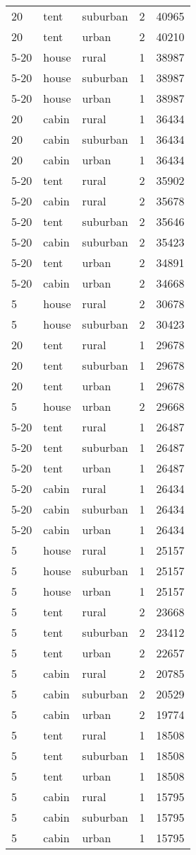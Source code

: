 \begin{center}
\begin{longtable}{llllr}
20 & tent & suburban & 2 & 40965 \\
20 & tent & urban & 2 & 40210 \\
5-20 & house & rural & 1 & 38987 \\
5-20 & house & suburban & 1 & 38987 \\
5-20 & house & urban & 1 & 38987 \\
20 & cabin & rural & 1 & 36434 \\
20 & cabin & suburban & 1 & 36434 \\
20 & cabin & urban & 1 & 36434 \\
5-20 & tent & rural & 2 & 35902 \\
5-20 & cabin & rural & 2 & 35678 \\
5-20 & tent & suburban & 2 & 35646 \\
5-20 & cabin & suburban & 2 & 35423 \\
5-20 & tent & urban & 2 & 34891 \\
5-20 & cabin & urban & 2 & 34668 \\
5 & house & rural & 2 & 30678 \\
5 & house & suburban & 2 & 30423 \\
20 & tent & rural & 1 & 29678 \\
20 & tent & suburban & 1 & 29678 \\
20 & tent & urban & 1 & 29678 \\
5 & house & urban & 2 & 29668 \\
5-20 & tent & rural & 1 & 26487 \\
5-20 & tent & suburban & 1 & 26487 \\
5-20 & tent & urban & 1 & 26487 \\
5-20 & cabin & rural & 1 & 26434 \\
5-20 & cabin & suburban & 1 & 26434 \\
5-20 & cabin & urban & 1 & 26434 \\
5 & house & rural & 1 & 25157 \\
5 & house & suburban & 1 & 25157 \\
5 & house & urban & 1 & 25157 \\
5 & tent & rural & 2 & 23668 \\
5 & tent & suburban & 2 & 23412 \\
5 & tent & urban & 2 & 22657 \\
5 & cabin & rural & 2 & 20785 \\
5 & cabin & suburban & 2 & 20529 \\
5 & cabin & urban & 2 & 19774 \\
5 & tent & rural & 1 & 18508 \\
5 & tent & suburban & 1 & 18508 \\
5 & tent & urban & 1 & 18508 \\
5 & cabin & rural & 1 & 15795 \\
5 & cabin & suburban & 1 & 15795 \\
5 & cabin & urban & 1 & 15795 \\
\end{longtable}
\end{center}
